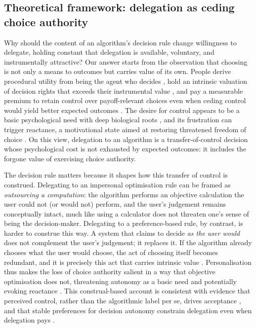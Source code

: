 \documentclass[a4paper, 12pt, fleqn]{article}
\theoremstyle{hypstyle}
\begin{document}
\subsection*{Theoretical framework: delegation as ceding choice authority}
Why should the content of an algorithm's decision rule change willingness to delegate, holding constant that delegation is available, voluntary, and instrumentally attractive? Our answer starts from the observation that choosing is not only a means to outcomes but carries value of its own. People derive procedural utility from being the agent who decides \citep{FreyBenzStutzer2004}, hold an intrinsic valuation of decision rights that exceeds their instrumental value \citep{Bartling2014}, and pay a measurable premium to retain control over payoff-relevant choices even when ceding control would yield better expected outcomes \citep{Owens2014}. The desire for control appears to be a basic psychological need with deep biological roots \citep{Leotti2010}, and its frustration can trigger reactance, a motivational state aimed at restoring threatened freedom of choice \citep{Brehm1966}. On this view, delegation to an algorithm is a transfer-of-control decision \citep{Candrian2022} whose psychological cost is not exhausted by expected outcomes: it includes the forgone value of exercising choice authority.

The decision rule matters because it shapes how this transfer of control is construed. Delegating to an impersonal optimisation rule can be framed as \emph{outsourcing a computation}: the algorithm performs an objective calculation the user could not (or would not) perform, and the user's judgement remains conceptually intact, much like using a calculator does not threaten one's sense of being the decision-maker. Delegating to a preference-based rule, by contrast, is harder to construe this way. A system that claims to decide \emph{as the user would} does not complement the user's judgement; it replaces it. If the algorithm already chooses what the user would choose, the act of choosing itself becomes redundant, and it is precisely this act that carries intrinsic value \citep{Bartling2014,Owens2014}. Personalisation thus makes the loss of choice authority salient in a way that objective optimisation does not, threatening autonomy as a basic need \citep{DeciRyan2000} and potentially evoking reactance \citep{Brehm1966}. This construal-based account is consistent with evidence that perceived control, rather than the algorithmic label per se, drives acceptance \citep{Schaap2024}, and that stable preferences for decision autonomy constrain delegation even when delegation pays \citep{Ivanova-Stenzel2025}.
\end{document}
